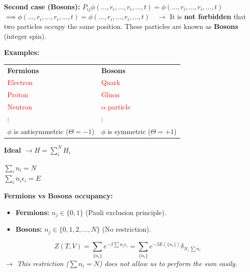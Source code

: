 \documentclass[12pt,a4paper]{report}
\newcommand{\esp}{\vspace{0.5cm}}
\begin{document}
	\esp
	
	\textbf{Second case (Bosons):} $P_{ij} \phi(\dots, r_i, \dots, r_i, \dots, t) = \phi(\dots, r_i, \dots, r_i, \dots, t)$ \\
	$\implies \phi(\dots, r_i, \dots, r_i, \dots, t) = \phi(\dots, r_i, \dots, r_i, \dots, t) \quad \to$ It is \textbf{not forbidden} that two particles occupy the same position. These particles are known as \textbf{Bosons} (integer spin).
	
	\esp
	
	\textbf{Examples:}
	
	\esp
	
	\begin{table}[h]
		\centering
		\begin{tabular}{ll}
			\textbf{Fermions} & \textbf{Bosons} \\
			\textcolor{red}{Electron} & \textcolor{red}{Quark} \\
			\textcolor{red}{Proton} & \textcolor{red}{Gluon} \\
			\textcolor{red}{Neutron} & \textcolor{red}{$\alpha$ particle} \\
			$\vdots$ & $\vdots$ \\
			$\phi$ is antisymmetric ($\Theta = -1$) & $\phi$ is symmetric ($\Theta = +1$)
		\end{tabular}
	\end{table}
	
	\esp
	
	\textbf{Ideal $\to H = \sum_i^N H_i$}
	
	\esp
	
	$\sum_i n_i = N$ \\
	$\sum_i n_i \epsilon_i = E$
	
	\esp
	
	\textbf{Fermions vs Bosons occupancy:}
	
	\esp
	
	\begin{itemize}
		\item \textbf{Fermions:} $n_j \in \{0, 1\}$ (Pauli exclusion principle).
		\item \textbf{Bosons:} $n_j \in \{0, 1, 2, \dots, N\}$ (No restriction).
	\end{itemize}
	
	\esp
	
	\begin{equation}
		Z(T, V) = \sum_{\{n_i\}} e^{-\beta \sum n_i \epsilon_i} = \sum_{\{n_i\}} e^{-\beta E(\{n_i\})} \delta_{N, \sum n_i}
	\end{equation}
	$\to$ \textit{This restriction ($\sum n_i = N$) does not allow us to perform the sum easily.}
	
\end{document}
